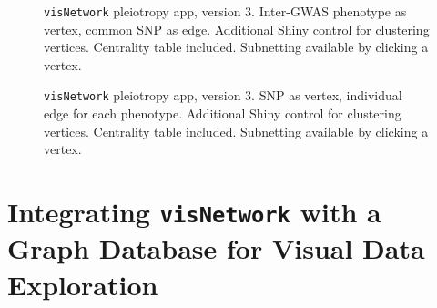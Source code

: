 \documentclass[10pt, letterpaper]{article}
\begin{document}
\begin{spacing}{1.0}
\begin{figure}[H]
    \centering
    \caption{\texttt{visNetwork} pleiotropy app, version 3.  Inter-GWAS phenotype as vertex, common SNP as edge.  Additional Shiny control for clustering vertices.  Centrality table included.  Subnetting available by clicking a vertex.}
    \label{fg:visNetworkAppV3a}
\end{figure}


\begin{figure}[H]
    \centering
    \caption{\texttt{visNetwork} pleiotropy app, version 3.  SNP as vertex, individual edge for each phenotype.  Additional Shiny control for clustering vertices.  Centrality table included.  Subnetting available by clicking a vertex.}
    \label{fg:visNetworkAppV3b}
\end{figure}


\section{Integrating \texttt{visNetwork} with a Graph Database for Visual Data Exploration}\label{sec:UCD}


\end{spacing}
\end{document}

